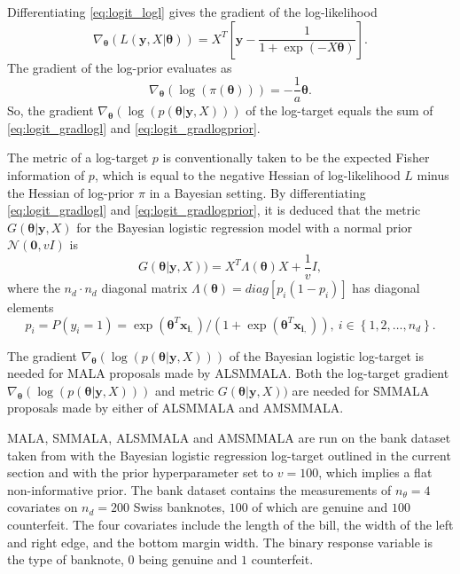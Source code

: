 \documentclass[twoside,11pt]{article}
\begin{document}
{Differentiating \eqref{eq:logit_logl} gives the gradient of the log-likelihood
\begin{equation}
\label{eq:logit_gradlogl}
\nabla_{\boldsymbol{\theta}}(L(\mathbf{y},X|\boldsymbol{\theta}))=
X^T\left[\mathbf{y}-
\frac{1}{1+\exp\left(-X\boldsymbol{\theta}\right)}\right].
\end{equation}
The gradient of the log-prior evaluates as
\begin{equation}
\label{eq:logit_gradlogprior}
\nabla_{\boldsymbol{\theta}}(\log{(\pi({\boldsymbol{\theta}}))})=
-\frac{1}{a}\boldsymbol{\theta}.
\end{equation}
So, the gradient
$\nabla_{\boldsymbol{\theta}}(\log{(p(\boldsymbol{\theta}|\mathbf{y}, X))})$ of the log-target equals the sum of
\eqref{eq:logit_gradlogl} and \eqref{eq:logit_gradlogprior}.

The metric of a log-target $p$ is conventionally taken to be the expected Fisher information of $p$, which is equal to the 
negative Hessian of log-likelihood $L$ minus the Hessian of log-prior $\pi$ in a Bayesian setting. By differentiating 
\eqref{eq:logit_gradlogl} and \eqref{eq:logit_gradlogprior}, it is deduced that the metric 
$G(\boldsymbol{\theta}|\mathbf{y}, X)$ for the Bayesian logistic regression model with a normal prior
$\mathcal{N}(\boldsymbol{0},vI)$ is
\begin{equation}
\label{eq:blr:G:normalprior}
G(\boldsymbol{\theta}|\mathbf{y}, X))=X^T\Lambda(\boldsymbol{\theta})X+
\frac{1}{v}I,
\end{equation}
where the $n_d\cdot n_d$ diagonal matrix $\Lambda(\boldsymbol{\theta})=diag[p_i(1-p_i)]$ has diagonal elements
\begin{equation}
p_i=P(y_i=1)=\exp(\boldsymbol{\theta}^T\mathbf{x_{i,}})/
(1+\exp(\boldsymbol{\theta}^T\mathbf{x_{i,}})),~i\in\left\{1,2,\dots,n_{d}\right\}.
\end{equation}

The gradient
$\nabla_{\boldsymbol{\theta}}(\log{(p(\boldsymbol{\theta}|\mathbf{y}, X))})$
of the Bayesian logistic log-target is needed for MALA proposals made by ALSMMALA. Both the log-target gradient
$\nabla_{\boldsymbol{\theta}}(\log{(p(\boldsymbol{\theta}|\mathbf{y}, X))})$ and metric
$G(\boldsymbol{\theta}|\mathbf{y}, X))$ are needed for SMMALA proposals made by either of ALSMMALA and AMSMMALA.

MALA, SMMALA, ALSMMALA and AMSMMALA are run on the bank dataset taken from \cite{flu_rie__mul} with the Bayesian logistic 
regression log-target outlined in the current section and with the prior hyperparameter set to $v=100$, which implies a  
flat non-informative prior. The bank dataset contains the measurements of $n_{\theta}=4$ covariates on $n_d=200$ Swiss 
banknotes, $100$ of which are genuine and $100$ counterfeit. The four covariates include the length of the bill, the width 
of the left and right edge, and the bottom margin width. The binary response variable is the type of banknote, $0$ being 
genuine and $1$ counterfeit.

}
\end{document}
